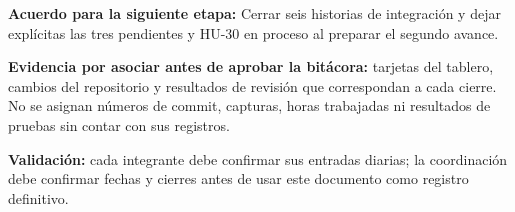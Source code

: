 \textbf{Acuerdo para la siguiente etapa:} Cerrar seis historias de integración y dejar explícitas las tres pendientes y HU-30 en proceso al preparar el segundo avance.

\textbf{Evidencia por asociar antes de aprobar la bitácora:} tarjetas del tablero, cambios del repositorio y resultados de revisión que correspondan a cada cierre. No se asignan números de commit, capturas, horas trabajadas ni resultados de pruebas sin contar con sus registros.

\textbf{Validación:} cada integrante debe confirmar sus entradas diarias; la coordinación debe confirmar fechas y cierres antes de usar este documento como registro definitivo.

